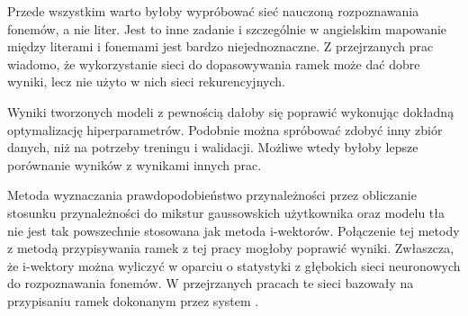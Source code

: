 Przede wszystkim warto byłoby wypróbować sieć nauczoną rozpoznawania fonemów, a nie liter.
Jest to inne zadanie i szczególnie w angielskim mapowanie między literami i fonemami
jest bardzo niejednoznaczne. Z przejrzanych prac wiadomo, że wykorzystanie sieci
do dopasowywania ramek może dać dobre wyniki, lecz nie użyto w nich sieci rekurencyjnych.

Wyniki tworzonych modeli z pewnością dałoby się poprawić wykonując dokładną
optymalizację hiperparametrów. Podobnie można spróbować zdobyć inny zbiór danych,
niż  na potrzeby treningu i walidacji. Możliwe wtedy
byłoby lepsze porównanie wyników z wynikami innych prac.

Metoda wyznaczania prawdopodobieństwo przynależności przez obliczanie stosunku
przynależności do mikstur gaussowskich użytkownika oraz modelu tła nie jest
tak powszechnie stosowana jak metoda i-wektorów. Połączenie tej metody
z metodą przypisywania ramek z tej pracy mogłoby poprawić wyniki.
Zwłaszcza, że i-wektory można wyliczyć w oparciu o statystyki z głębokich sieci
neuronowych do rozpoznawania fonemów. W przejrzanych pracach te sieci bazowały
na przypisaniu ramek dokonanym przez system .

